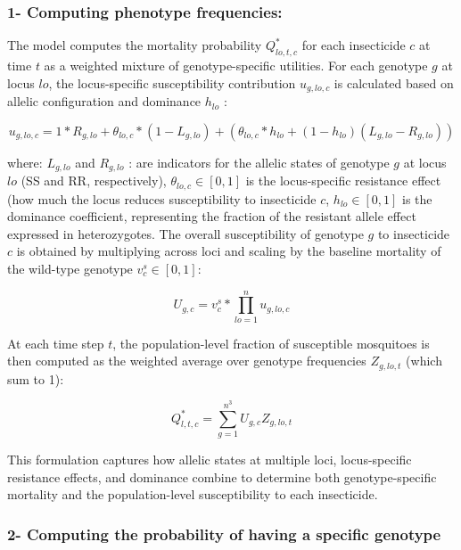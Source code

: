 \documentclass[
]{article}
\begin{document}
\subsubsection{1- Computing phenotype
frequencies:}\label{computing-phenotype-frequencies}

The model computes the mortality probability \(Q^{*}_{lo,t, c}\) for
each insecticide \(c\) at time \(t\) as a weighted mixture of
genotype-specific utilities. For each genotype \(g\) at locus \(lo\),
the locus-specific susceptibility contribution \(u_{g,lo,c}\) is
calculated based on allelic configuration and dominance \(ℎ_{lo}\) :

\[
u_{g,lo,c} = 1 * R_{g,lo} + \theta_{lo,c} * (1 - L_{g,lo}) + (\theta_{lo,c} * ℎ_{lo} + (1 - h_{lo}) (L_{g,lo} - R_{g,lo}))
\]

where: \(L_{g,lo}\) and \(R_{g,lo}\) : are indicators for the allelic
states of genotype \(g\) at locus \(lo\) (SS and RR, respectively),
\(\theta_{lo,c} \in [0,1]\) is the locus-specific resistance effect (how
much the locus reduces susceptibility to insecticide \(c\),
\(ℎ_{lo} \in [0,1]\) is the dominance coefficient, representing the
fraction of the resistant allele effect expressed in heterozygotes. The
overall susceptibility of genotype \(g\) to insecticide \(c\) is
obtained by multiplying across loci and scaling by the baseline
mortality of the wild-type genotype \(v_{c}^{s} \in [0,1]\):

\[
U_{g,c} = v_{c}^{s} * \prod_{lo=1}^{n} u_{g,lo,c}
\]

At each time step \(t\), the population-level fraction of susceptible
mosquitoes is then computed as the weighted average over genotype
frequencies \(Z_{g,lo,t}\) (which sum to 1):

\[
Q_{l,t,c}^{*} = \sum_{g=1}^{n^{3}} U_{g,c} Z_{g,lo,t}
\]

This formulation captures how allelic states at multiple loci,
locus-specific resistance effects, and dominance combine to determine
both genotype-specific mortality and the population-level susceptibility
to each insecticide.

\subsubsection{2- Computing the probability of having a specific
genotype}\label{computing-the-probability-of-having-a-specific-genotype}
\end{document}
